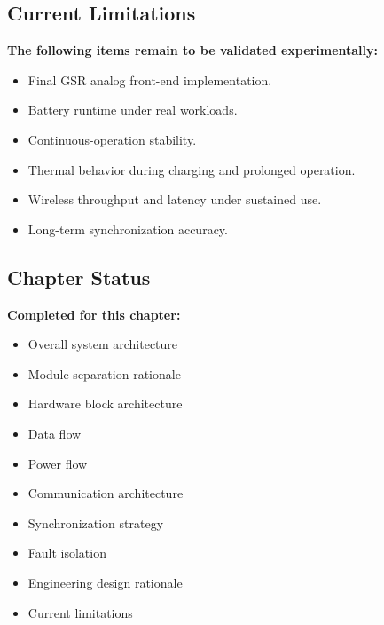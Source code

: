 \subsection{Current Limitations}
\label{sec:current-limitations-ch3}

\begin{requirementbox}
\textbf{The following items remain to be validated experimentally:}
\begin{itemize}
    \item Final GSR analog front-end implementation.
    \item Battery runtime under real workloads.
    \item Continuous-operation stability.
    \item Thermal behavior during charging and prolonged operation.
    \item Wireless throughput and latency under sustained use.
    \item Long-term synchronization accuracy.
\end{itemize}
\end{requirementbox}

\subsection{Chapter Status}
\label{sec:ch3-status}

\begin{validationbox}
\textbf{Completed for this chapter:}
\begin{itemize}
    \item Overall system architecture
    \item Module separation rationale
    \item Hardware block architecture
    \item Data flow
    \item Power flow
    \item Communication architecture
    \item Synchronization strategy
    \item Fault isolation
    \item Engineering design rationale
    \item Current limitations
\end{itemize}
\end{validationbox}

